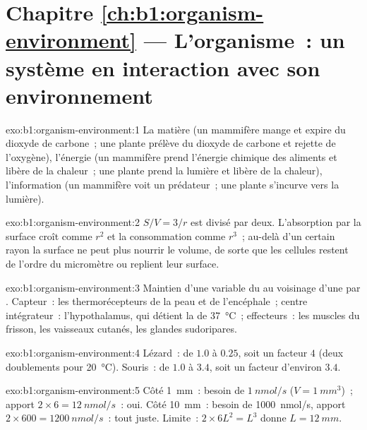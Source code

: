 \section*{Chapitre \ref{ch:b1:organism-environment} --- L'organisme~: un système en interaction avec son environnement}

\begin{solution}{exo:b1:organism-environment:1}
La matière (un mammifère mange et expire du dioxyde de carbone~; une
plante prélève du dioxyde de carbone et rejette de l'oxygène), l'énergie
(un mammifère prend l'énergie chimique des aliments et libère de la
chaleur~; une plante prend la lumière et libère de la chaleur),
l'information (un mammifère voit un prédateur~; une plante s'incurve
vers la lumière).
\end{solution}

\begin{solution}{exo:b1:organism-environment:2}
$S/V = 3/r$ est divisé par deux. L'absorption par la surface croît comme
$r^2$ et la consommation comme $r^3$~; au-delà d'un certain rayon la
surface ne peut plus nourrir le volume, de sorte que les cellules
restent de l'ordre du micromètre ou replient leur surface.
\end{solution}

\begin{solution}{exo:b1:organism-environment:3}
Maintien d'une variable du  au voisinage d'une  par . Capteur~: les thermorécepteurs de la
peau et de l'encéphale~; centre intégrateur~: l'hypothalamus, qui
détient la  de \qty{37}{\celsius}~; effecteurs~: les
muscles du frisson, les vaisseaux cutanés, les glandes sudoripares.
\end{solution}

\begin{solution}{exo:b1:organism-environment:4}
Lézard~: de $1.0$ à $0.25$, soit un facteur $4$ (deux doublements pour
\qty{20}{\celsius}). Souris~: de $1.0$ à $3.4$, soit un facteur d'environ
$3.4$.
\end{solution}

\begin{solution}{exo:b1:organism-environment:5}
Côté \qty{1}{mm}~: besoin de $\qty{1}{nmol/s}$ ($V = \qty{1}{mm^3}$)~;
apport $2\times 6 = \qty{12}{nmol/s}$~: oui. Côté \qty{10}{mm}~: besoin
de \qty{1000}{nmol/s}, apport $2\times 600 = \qty{1200}{nmol/s}$~: tout
juste. Limite~: $2\times 6L^2 = L^3$ donne $L = \qty{12}{mm}$.
\end{solution}

